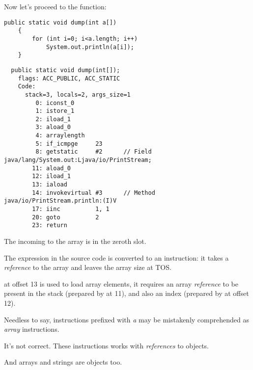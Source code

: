 Now let's proceed to the  function:

\begin{lstlisting}[style=customjava]
	public static void dump(int a[])
	{
		for (int i=0; i<a.length; i++)
			System.out.println(a[i]);
	}
\end{lstlisting}

\begin{lstlisting}
  public static void dump(int[]);
    flags: ACC_PUBLIC, ACC_STATIC
    Code:
      stack=3, locals=2, args_size=1
         0: iconst_0      
         1: istore_1      
         2: iload_1       
         3: aload_0       
         4: arraylength   
         5: if_icmpge     23
         8: getstatic     #2      // Field java/lang/System.out:Ljava/io/PrintStream;
        11: aload_0       
        12: iload_1       
        13: iaload        
        14: invokevirtual #3      // Method java/io/PrintStream.println:(I)V
        17: iinc          1, 1
        20: goto          2
        23: return        
\end{lstlisting}

The incoming  to the array is in the zeroth slot.

The  expression in the source code is converted to an  instruction: 
it takes a \emph{reference} to the array and leaves the array size at \ac{TOS}.

 at offset 13 is used to load array elements, 
it requires an array \emph{reference} to be present
in the stack (prepared by  at 11), 
and also an index (prepared by  at offset 12).

Needless to say, instructions prefixed with \emph{a} may be mistakenly comprehended 
as \emph{array} instructions.

It's not correct.
These instructions works with \emph{references} to objects.

And arrays and strings are objects too.

